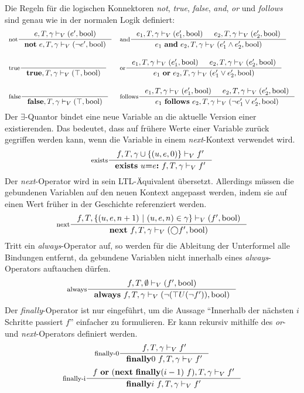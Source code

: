 Die Regeln für die logischen Konnektoren \emph{not}, \emph{true}, \emph{false}, \emph{and}, \emph{or} und \emph{follows} sind genau wie in der normalen Logik definiert:
\[
\begin{array}{ll}
  \inference[not]{e,T,\gamma\vdash_V (e',\textrm{bool})}{\textbf{not}\ e,T,\gamma\vdash_V (\lnot e',\textrm{bool})} &
  \inference[and]{e_1,T,\gamma\vdash_V (e_1',\textrm{bool}) & e_2,T,\gamma\vdash_V (e_2',\textrm{bool})}{e_1\ \textbf{and}\ e_2,T,\gamma\vdash_V (e_1'\land e_2',\textrm{bool})}\\[20pt]
  \inference[true]{}{\textbf{true},T,\gamma\vdash_V(\top,\textrm{bool})} &
  \inference[or]{e_1,T,\gamma\vdash_V (e_1',\textrm{bool}) & e_2,T,\gamma\vdash_V (e_2',\textrm{bool})}{e_1\ \textbf{or}\ e_2,T,\gamma\vdash_V (e_1'\lor e_2',\textrm{bool})}\\[20pt]
  \inference[false]{}{\textbf{false},T,\gamma\vdash_V(\top,\textrm{bool})} &
  \inference[follows]{e_1,T,\gamma\vdash_V (e_1',\textrm{bool}) & e_2,T,\gamma\vdash_V (e_2',\textrm{bool})}{e_1\ \textbf{follows}\ e_2,T,\gamma\vdash_V (\lnot e_1'\lor e_2',\textrm{bool})}
\end{array}
\]
Der $\exists$-Quantor bindet eine neue Variable an die aktuelle Version einer existierenden.
Das bedeutet, dass auf frühere Werte einer Variable zurück gegriffen werden kann, wenn die Variable in einem \emph{next}-Kontext verwendet wird.
\[
\inference[exists]{f,T,\gamma\cup\{(u,e,0)\}\vdash_V f'}{\textbf{exists}\ u\textbf{=}e\textbf{:}\ f,T,\gamma\vdash_V f'}
\]
Der \emph{next}-Operator wird in sein LTL-Äquivalent übersetzt.
Allerdings müssen die gebundenen Variablen auf den neuen Kontext angepasst werden, indem sie auf einen Wert früher in der Geschichte referenziert werden.
\[
\inference[next]{f,T,\{ (u,e,n+1)\ |\ (u,e,n)\in\gamma\}\vdash_V (f',\textrm{bool})}{\textbf{next}\ f,T,\gamma\vdash_V (\bigcirc f',\textrm{bool})}
\]
Tritt ein \emph{always}-Operator auf, so werden für die Ableitung der Unterformel alle Bindungen entfernt, da gebundene Variablen nicht innerhalb eines \emph{always}-Operators auftauchen dürfen.
\[
\inference[always]{f,T,\emptyset\vdash_V (f',\textrm{bool})}{\textbf{always}\ f,T,\gamma\vdash_V (\lnot(\top U (\lnot f')),\textrm{bool})}
\]
Der \emph{finally}-Operator ist nur eingeführt, um die Aussage "`Innerhalb der nächsten $i$ Schritte passiert $f$"' einfacher zu formulieren.
Er kann rekursiv mithilfe des \emph{or}- und \emph{next}-Operators definiert werden.
\[
\inference[finally-0]{f,T,\gamma\vdash_V f'}{\textbf{finally}0\ f,T,\gamma\vdash_V f'}
\]
\[
\inference[finally-i]{f\ \textbf{or}\ (\textbf{next}\ \textbf{finally}(i-1)\ f),T,\gamma\vdash_V f'}{\textbf{finally}i\ f,T,\gamma\vdash_V f'}
\]

